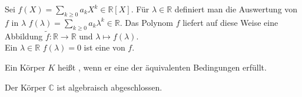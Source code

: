 \begin{definition}[Nullstelle]
	Sei $f(X)=\sum_{k \ge 0} a_kX^k \in \mathbb R[X]$. Für $\lambda \in
	\mathbb R$ definiert man die Auswertung von $f$ in $\lambda$ $f(\lambda)=\sum_{k \ge 0} a_k\lambda^k
	\in \mathbb R$. Das Polynom $f$ liefert auf diese Weise eine Abbildung $\tilde f: \mathbb R \to \mathbb R$ und
	$\lambda \mapsto f(\lambda)$. \\
	Ein $\lambda \in \mathbb R$ $f(\lambda)=0$ ist eine  von $f$.
\end{definition}

\begin{definition}
	Ein Körper $K$ heißt , wenn er eine 
	der äquivalenten Bedingungen erfüllt. 
\end{definition}

\begin{theorem}
	Der Körper $\mathbb C$ ist algebraisch abgeschlossen.
\end{theorem}